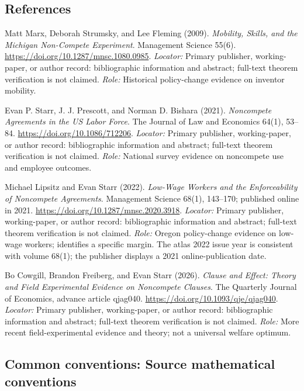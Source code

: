 \documentclass[11pt,a4paper]{article}
\begin{document}
\subsection*{References}
\begin{enumerate}[label=\textnormal{[S\arabic*]},leftmargin=*]
\item Matt Marx, Deborah Strumsky, and Lee Fleming (2009). \emph{Mobility, Skills, and the Michigan Non-Compete Experiment}. Management Science 55(6). \url{https://doi.org/10.1287/mnsc.1080.0985}. \textit{Locator:} Primary publisher, working-paper, or author record: bibliographic information and abstract; full-text theorem verification is not claimed. \textit{Role:} Historical policy-change evidence on inventor mobility.
\item Evan P. Starr, J. J. Prescott, and Norman D. Bishara (2021). \emph{Noncompete Agreements in the US Labor Force}. The Journal of Law and Economics 64(1), 53--84. \url{https://doi.org/10.1086/712206}. \textit{Locator:} Primary publisher, working-paper, or author record: bibliographic information and abstract; full-text theorem verification is not claimed. \textit{Role:} National survey evidence on noncompete use and employee outcomes.
\item Michael Lipsitz and Evan Starr (2022). \emph{Low-Wage Workers and the Enforceability of Noncompete Agreements}. Management Science 68(1), 143--170; published online in 2021. \url{https://doi.org/10.1287/mnsc.2020.3918}. \textit{Locator:} Primary publisher, working-paper, or author record: bibliographic information and abstract; full-text theorem verification is not claimed. \textit{Role:} Oregon policy-change evidence on low-wage workers; identifies a specific margin. The atlas 2022 issue year is consistent with volume 68(1); the publisher displays a 2021 online-publication date.
\item Bo Cowgill, Brandon Freiberg, and Evan Starr (2026). \emph{Clause and Effect: Theory and Field Experimental Evidence on Noncompete Clauses}. The Quarterly Journal of Economics, advance article qjag040. \url{https://doi.org/10.1093/qje/qjag040}. \textit{Locator:} Primary publisher, working-paper, or author record: bibliographic information and abstract; full-text theorem verification is not claimed. \textit{Role:} More recent field-experimental evidence and theory; not a universal welfare optimum.
\end{enumerate}

\subsection*{Common conventions: Source mathematical conventions}
\end{document}
